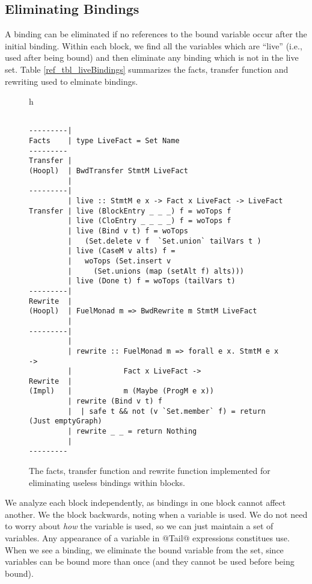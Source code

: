 \documentclass[12pt]{report}
\begin{document}
\subsection{Eliminating Bindings}
\label{ref_sub_elim_bindings}

A binding can be eliminated if no references to the bound variable
occur after the initial binding. Within each block, we find all the
variables which are ``live'' (i.e., used after being bound) and then
eliminate any binding which is not in the live set. Table
\ref{ref_tbl_liveBindings} summarizes the facts, transfer function
and rewriting used to elminate bindings.

\begin{figure}{h}
\begin{verbatim}

---------|
Facts    | type LiveFact = Set Name
---------
Transfer |
(Hoopl)  | BwdTransfer StmtM LiveFact
         |
---------|
         | live :: StmtM e x -> Fact x LiveFact -> LiveFact
Transfer | live (BlockEntry _ _ _) f = woTops f
         | live (CloEntry _ _ _ _) f = woTops f
         | live (Bind v t) f = woTops
         |   (Set.delete v f  `Set.union` tailVars t )
         | live (CaseM v alts) f =
         |   woTops (Set.insert v
         |     (Set.unions (map (setAlt f) alts)))
         | live (Done t) f = woTops (tailVars t)
---------|
Rewrite  |
(Hoopl)  | FuelMonad m => BwdRewrite m StmtM LiveFact
         |
---------|
         |
         | rewrite :: FuelMonad m => forall e x. StmtM e x ->
         |            Fact x LiveFact ->
Rewrite  |
(Impl)   |            m (Maybe (ProgM e x))
         | rewrite (Bind v t) f
         |  | safe t && not (v `Set.member` f) = return (Just emptyGraph)
         | rewrite _ _ = return Nothing
         |
---------
\end{verbatim}
\caption{The facts, transfer function and rewrite function
implemented for eliminating useless bindings within blocks.}
\end{figure}

We analyze each block independently, as
bindings in one block cannot affect another. We the block
backwards, noting when a variable is used. We do not need to worry
about \emph{how} the variable is used, so we can just maintain a set
of variables. Any appearance of a variable in @Tail@ expressions constitues
use. When we see a binding, we eliminate the bound variable
from the set, since variables can be bound more than once (and they
cannot be used before being bound).

\end{document}

